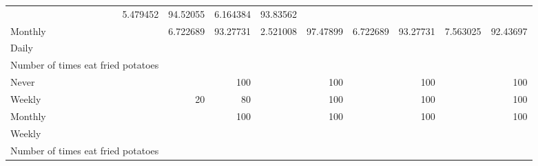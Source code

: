 \documentclass{article}
\begin{document}
\begin{tabular}{lllllllll}
  \multicolumn{1}{r}{5.479452} &
  \multicolumn{1}{r}{94.52055} &
  \multicolumn{1}{r}{6.164384} &
  \multicolumn{1}{r}{93.83562} \\
\multicolumn{1}{l}{\hspace{7em}Monthly} &
  \multicolumn{1}{|r}{6.722689} &
  \multicolumn{1}{r}{93.27731} &
  \multicolumn{1}{r}{2.521008} &
  \multicolumn{1}{r}{97.47899} &
  \multicolumn{1}{r}{6.722689} &
  \multicolumn{1}{r}{93.27731} &
  \multicolumn{1}{r}{7.563025} &
  \multicolumn{1}{r}{92.43697} \\
\multicolumn{1}{l}{\hspace{5em}Daily} &
  \multicolumn{1}{|r}{} &
  \multicolumn{1}{r}{} &
  \multicolumn{1}{r}{} &
  \multicolumn{1}{r}{} &
  \multicolumn{1}{r}{} &
  \multicolumn{1}{r}{} &
  \multicolumn{1}{r}{} &
  \multicolumn{1}{r}{} \\
\multicolumn{1}{l}{\hspace{6em}Number of times eat fried potatoes} &
  \multicolumn{1}{|r}{} &
  \multicolumn{1}{r}{} &
  \multicolumn{1}{r}{} &
  \multicolumn{1}{r}{} &
  \multicolumn{1}{r}{} &
  \multicolumn{1}{r}{} &
  \multicolumn{1}{r}{} &
  \multicolumn{1}{r}{} \\
\multicolumn{1}{l}{\hspace{7em}Never} &
  \multicolumn{1}{|r}{} &
  \multicolumn{1}{r}{100} &
  \multicolumn{1}{r}{} &
  \multicolumn{1}{r}{100} &
  \multicolumn{1}{r}{} &
  \multicolumn{1}{r}{100} &
  \multicolumn{1}{r}{} &
  \multicolumn{1}{r}{100} \\
\multicolumn{1}{l}{\hspace{7em}Weekly} &
  \multicolumn{1}{|r}{20} &
  \multicolumn{1}{r}{80} &
  \multicolumn{1}{r}{} &
  \multicolumn{1}{r}{100} &
  \multicolumn{1}{r}{} &
  \multicolumn{1}{r}{100} &
  \multicolumn{1}{r}{} &
  \multicolumn{1}{r}{100} \\
\multicolumn{1}{l}{\hspace{7em}Monthly} &
  \multicolumn{1}{|r}{} &
  \multicolumn{1}{r}{100} &
  \multicolumn{1}{r}{} &
  \multicolumn{1}{r}{100} &
  \multicolumn{1}{r}{} &
  \multicolumn{1}{r}{100} &
  \multicolumn{1}{r}{} &
  \multicolumn{1}{r}{100} \\
\multicolumn{1}{l}{\hspace{5em}Weekly} &
  \multicolumn{1}{|r}{} &
  \multicolumn{1}{r}{} &
  \multicolumn{1}{r}{} &
  \multicolumn{1}{r}{} &
  \multicolumn{1}{r}{} &
  \multicolumn{1}{r}{} &
  \multicolumn{1}{r}{} &
  \multicolumn{1}{r}{} \\
\multicolumn{1}{l}{\hspace{6em}Number of times eat fried potatoes} &

\end{tabular}
\end{document}
